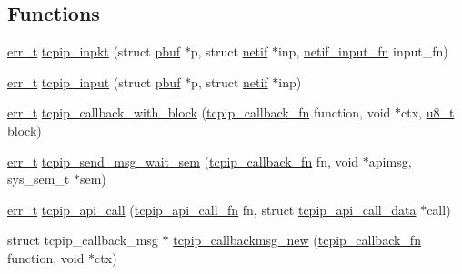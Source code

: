 \subsection*{Functions}
\begin{DoxyCompactItemize}
\item 
\hyperlink{group__infrastructure__errors_gaf02d9da80fd66b4f986d2c53d7231ddb}{err\+\_\+t} \hyperlink{openmote-cc2538_2lwip_2src_2api_2tcpip_8c_a93043b3c66dbe4a15a60299c6199d102}{tcpip\+\_\+inpkt} (struct \hyperlink{structpbuf}{pbuf} $\ast$p, struct \hyperlink{structnetif}{netif} $\ast$inp, \hyperlink{openmote-cc2538_2lwip_2src_2include_2lwip_2netif_8h_ab2302b1b64ac7b95f24c6bab754a575e}{netif\+\_\+input\+\_\+fn} input\+\_\+fn)
\item 
\hyperlink{group__infrastructure__errors_gaf02d9da80fd66b4f986d2c53d7231ddb}{err\+\_\+t} \hyperlink{group__lwip__os_gae510f195171bed8499ae94e264a92717}{tcpip\+\_\+input} (struct \hyperlink{structpbuf}{pbuf} $\ast$p, struct \hyperlink{structnetif}{netif} $\ast$inp)
\item 
\hyperlink{group__infrastructure__errors_gaf02d9da80fd66b4f986d2c53d7231ddb}{err\+\_\+t} \hyperlink{openmote-cc2538_2lwip_2src_2api_2tcpip_8c_ab1d3ef23817d7703fa75ed67bd45ea1d}{tcpip\+\_\+callback\+\_\+with\+\_\+block} (\hyperlink{openmote-cc2538_2lwip_2src_2include_2lwip_2tcpip_8h_a35203296bb838f3b493839ffc6e7285d}{tcpip\+\_\+callback\+\_\+fn} function, void $\ast$ctx, \hyperlink{group__compiler__abstraction_ga4caecabca98b43919dd11be1c0d4cd8e}{u8\+\_\+t} block)
\item 
\hyperlink{group__infrastructure__errors_gaf02d9da80fd66b4f986d2c53d7231ddb}{err\+\_\+t} \hyperlink{openmote-cc2538_2lwip_2src_2api_2tcpip_8c_a12bdf37eddcd72c4178e3ea7d370395d}{tcpip\+\_\+send\+\_\+msg\+\_\+wait\+\_\+sem} (\hyperlink{openmote-cc2538_2lwip_2src_2include_2lwip_2tcpip_8h_a35203296bb838f3b493839ffc6e7285d}{tcpip\+\_\+callback\+\_\+fn} fn, void $\ast$apimsg, sys\+\_\+sem\+\_\+t $\ast$sem)
\item 
\hyperlink{group__infrastructure__errors_gaf02d9da80fd66b4f986d2c53d7231ddb}{err\+\_\+t} \hyperlink{openmote-cc2538_2lwip_2src_2api_2tcpip_8c_a3d42b0c46607f91aedcc7745ed466b08}{tcpip\+\_\+api\+\_\+call} (\hyperlink{openmote-cc2538_2lwip_2src_2include_2lwip_2priv_2tcpip__priv_8h_aa7ecde8c8d8012fe5c498f7ee58f9458}{tcpip\+\_\+api\+\_\+call\+\_\+fn} fn, struct \hyperlink{structtcpip__api__call__data}{tcpip\+\_\+api\+\_\+call\+\_\+data} $\ast$call)
\item 
struct tcpip\+\_\+callback\+\_\+msg $\ast$ \hyperlink{openmote-cc2538_2lwip_2src_2api_2tcpip_8c_aee14fa2587a9ba9d23e4c7e16c4526ac}{tcpip\+\_\+callbackmsg\+\_\+new} (\hyperlink{openmote-cc2538_2lwip_2src_2include_2lwip_2tcpip_8h_a35203296bb838f3b493839ffc6e7285d}{tcpip\+\_\+callback\+\_\+fn} function, void $\ast$ctx)

\end{DoxyCompactItemize}
